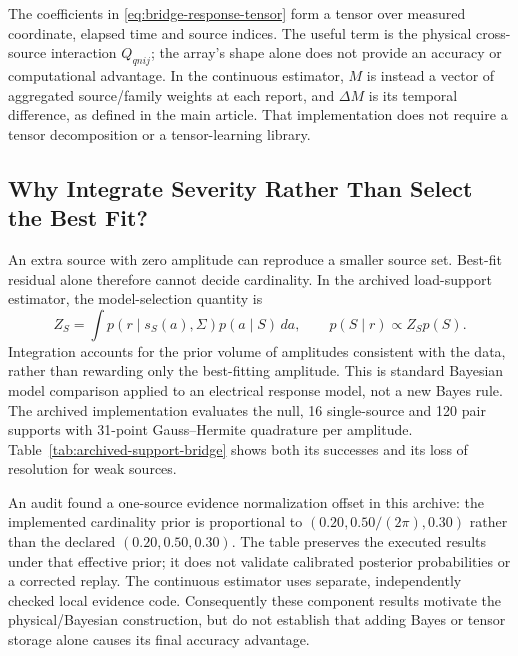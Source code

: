The coefficients in \eqref{eq:bridge-response-tensor} form a tensor over
measured coordinate, elapsed time and source indices. The useful term is
the physical cross-source interaction $Q_{qnij}$; the array's shape alone
does not provide an accuracy or computational advantage.
In the continuous estimator, $M$ is instead a vector of aggregated
source/family weights at each report, and $\Delta M$ is its temporal
difference, as defined in the main article.
That implementation does not require a tensor decomposition or a
tensor-learning library.

\subsection{Why Integrate Severity Rather Than Select the Best Fit?}
An extra source with zero amplitude can reproduce a smaller source set.
Best-fit residual alone therefore cannot decide cardinality. In the
archived load-support estimator, the model-selection quantity is
\begin{equation}
 Z_S=\int p(r\mid s_S(a),\Sigma)p(a\mid S)\,da,
 \qquad p(S\mid r)\propto Z_Sp(S).
 \label{eq:bridge-batch-evidence}
\end{equation}
Integration accounts for the prior volume of amplitudes consistent with
the data, rather than rewarding only the best-fitting amplitude. This is
standard Bayesian model comparison applied to an electrical response
model, not a new Bayes rule. The archived implementation evaluates the
null, 16 single-source and 120 pair supports with 31-point Gauss--Hermite
quadrature per amplitude. Table~\ref{tab:archived-support-bridge} shows
both its successes and its loss of resolution for weak sources.

\begin{table}[t]\centering\small
\caption{Archived joint cardinality-and-support decisions. Onset, load
family and operating context are supplied. These are noise replays of
shared physical trajectories, not independent continuous detections.}
\label{tab:archived-support-bridge}

\end{table}

An audit found a one-source evidence normalization offset in this
archive: the implemented cardinality prior is proportional to
$(0.20,0.50/(2\pi),0.30)$ rather than the declared $(0.20,0.50,0.30)$.
The table preserves the executed results under that effective prior;
it does not validate calibrated posterior probabilities or a corrected
replay. The continuous estimator uses separate, independently checked
local evidence code. Consequently these component results motivate the
physical/Bayesian construction, but do not establish that adding Bayes
or tensor storage alone causes its final accuracy advantage.

